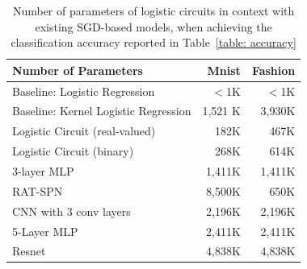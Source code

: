 \documentclass[letterpaper]{article} %
\begin{document}
          \begin{table}[tb]
 \centering
  \begin{minipage}{0.48\textwidth}
     {\footnotesize
          \caption{Number of parameters of logistic circuits in context with existing SGD-based models, when achieving the classification accuracy reported in Table~\ref{table: accuracy}
          }
          \label{table: size}
          \centering
          {\fontsize{8.3}{9}\selectfont
          \begin{sc}
          \begin{tabular}{ @{}l r r @{} }
          \toprule
       	 Number of Parameters & Mnist & Fashion \\
          \midrule\midrule
           Baseline: Logistic Regression & $<$1K & $<$1K \\
           Baseline: Kernel Logistic Regression & 1,521 K & 3,930K\\
                       \midrule
          Logistic Circuit (real-valued) & 182K & 467K\\
          Logistic Circuit (binary) & 268K & 614K \\
          \midrule
            3-layer MLP  & 1,411K  & 1,411K \\
 	RAT-SPN~ \cite{rat-spn2018} 	 & 8,500K & 650K \\
	CNN with 3 conv layers  & 2,196K & 2,196K\\
	            5-Layer MLP & 2,411K &  2,411K \\
                        Resnet \cite{he2016cvpr} & 4,838K & 4,838K \\
		\bottomrule
		\end{tabular}
          \end{sc}
     }}
    \end{minipage}
   \end{table}
\end{document}

